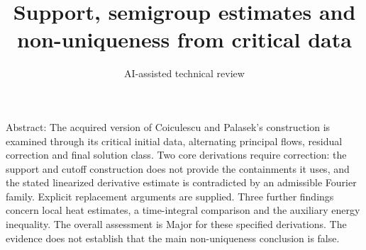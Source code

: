 \documentclass[10pt]{article}
\title{Support, semigroup estimates and non-uniqueness from critical data}
\author{AI-assisted technical review}
\date{}
\begin{document}
\maketitle
Abstract: The acquired version of Coiculescu and Palasek’s construction is examined through its critical initial data, alternating principal flows, residual correction and final solution class. Two core derivations require correction: the support and cutoff construction does not provide the containments it uses, and the stated linearized derivative estimate is contradicted by an admissible Fourier family. Explicit replacement arguments are supplied. Three further findings concern local heat estimates, a time-integral comparison and the auxiliary energy inequality. The overall assessment is Major for these specified derivations. The evidence does not establish that the main non-uniqueness conclusion is false.\par
\end{document}
